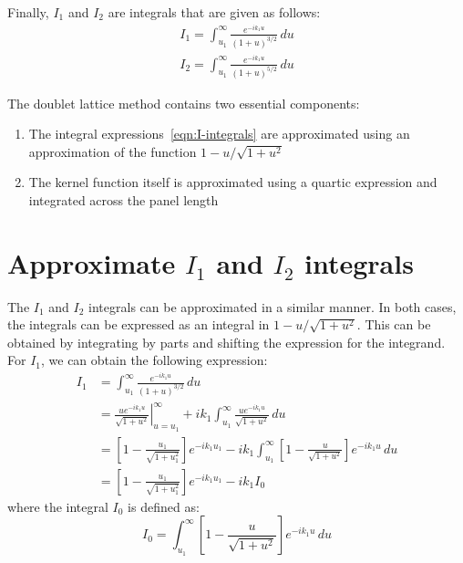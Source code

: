 \documentclass[12pt]{article}
\newcommand{\f}{\frac}
\begin{document}
Finally, $I_{1}$ and $I_{2}$ are integrals that are given as follows:
%
\begin{equation}
  \label{eqn:I-integrals}
  \begin{aligned}
    I_{1} = \int_{u_{1}}^{\infty} \f{e^{-ik_1u}}{(1 + u)^{3/2}} \, du \\
    I_{2} = \int_{u_{1}}^{\infty} \f{e^{-ik_1u}}{(1 + u)^{5/2}} \, du 
  \end{aligned}
\end{equation}

The doublet lattice method contains two essential components:
\begin{enumerate}
\item The integral expressions~\eqref{eqn:I-integrals} are
  approximated using an approximation of the function
  $1 - u/\sqrt{1 + u^2}$
\item The kernel function itself is approximated using a quartic
  expression and integrated across the panel length
\end{enumerate}

\section{Approximate $I_{1}$ and $I_{2}$ integrals}

The $I_{1}$ and $I_{2}$ integrals can be approximated in a similar
manner. In both cases, the integrals can be expressed as an integral
in $1 - u/\sqrt{1 + u^2}$. This can be obtained by integrating by
parts and shifting the expression for the integrand. For $I_{1}$, 
we can obtain the following expression:
\begin{equation*}
  \begin{aligned}
    I_{1} & = \int_{u_{1}}^{\infty} \f{e^{-ik_1u}}{(1 + u)^{3/2}} \, du \\
    & = \left. \f{u e^{-ik_1 u}}{\sqrt{1 + u^2}} \right|_{u=u_{1}}^{\infty} +
    ik_{1} \int_{u_{1}}^{\infty} \f{ue^{-ik_1 u}}{\sqrt{1 + u^2}} \, du \\
    & = \left[1 - \f{u_{1}}{\sqrt{1 + u_1^2}} \right]e^{-ik_{1}u_{1}} -
    ik_{1} \int_{u_{1}}^{\infty} \left[1 - \f{u}{\sqrt{1 + u^2}} \right] e^{-ik_1 u} \, du  \\
    & = \left[1 - \f{u_{1}}{\sqrt{1 + u_1^2}} \right]e^{-ik_{1}u_{1}} - ik_{1} I_{0}
  \end{aligned}
\end{equation*}
where the integral $I_{0}$ is defined as:
\begin{equation*}
  I_{0} = \int_{u_{1}}^{\infty} \left[ 1 - \f{u}{\sqrt{1 + u^2}} \right] e^{-ik_1 u} \, du
\end{equation*}
\end{document}
